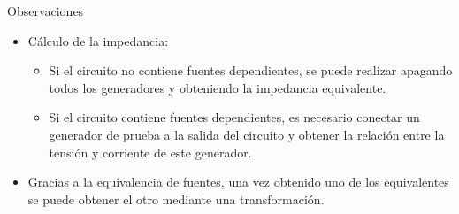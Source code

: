 \documentclass[aspectratio=169, usenames,svgnames,dvipsnames]{beamer}
\begin{document}
\begin{frame}[label={sec:org70202a3}]{Observaciones}
\begin{itemize}
\item Cálculo de la impedancia:
\begin{itemize}
\item Si el circuito \alert{no} contiene fuentes dependientes, se puede realizar \alert{apagando} todos los \alert{generadores} y obteniendo la impedancia equivalente.
\item Si el circuito contiene fuentes dependientes, es necesario conectar un \alert{generador de prueba} a la salida del circuito y obtener la relación entre la tensión y corriente de este generador.
\end{itemize}

\item Gracias a la equivalencia de fuentes, una vez obtenido uno de los equivalentes se puede obtener el otro mediante una transformación.
\end{itemize}
\end{frame}
\end{document}
